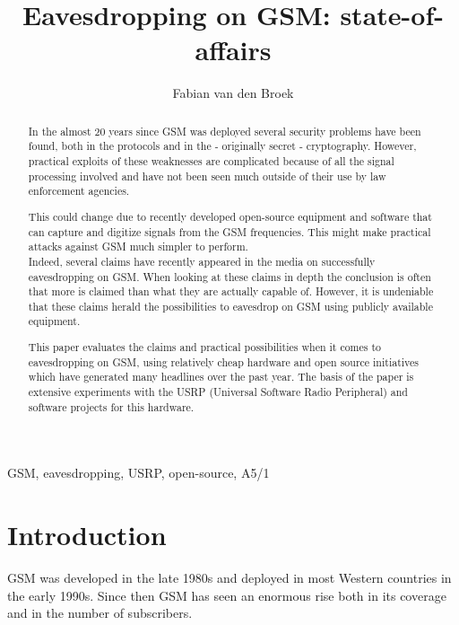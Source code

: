 \documentclass[a4paper,11pt]{llncs}
\begin{document}
\author{Fabian van den Broek}
\title{Eavesdropping on GSM: state-of-affairs}
\maketitle

\begin{abstract}
In the almost 20 years since GSM was deployed several security problems have been found, both in the protocols and in the - originally secret - cryptography. However, practical exploits of these weaknesses are complicated because of all the signal processing involved and have not been seen much outside of their use by law enforcement agencies.

This could change due to recently developed open-source equipment and software that can capture
and digitize signals from the GSM frequencies. This might make practical attacks against GSM much
simpler to perform.\\

Indeed, several claims have recently appeared in the media on successfully eavesdropping on GSM. When looking at these claims in depth the conclusion is often that more is claimed than what they are actually capable of. However, it is undeniable that these claims herald the possibilities to eavesdrop on GSM using publicly available equipment.

This paper evaluates the claims and practical possibilities when it comes to eavesdropping on GSM, using relatively cheap hardware and open source initiatives which have generated many headlines over the past year.
The basis of the paper is extensive experiments with the USRP (Universal Software Radio Peripheral) and software projects for this hardware.
\end{abstract}

\begin{keywords}
GSM, eavesdropping, USRP, open-source, A5/1 
\end{keywords}

\section{Introduction}
GSM was developed in the late 1980s and deployed in most Western countries in the early 1990s. Since then GSM has seen an enormous rise both in its coverage and in the number of subscribers.
\end{document}
